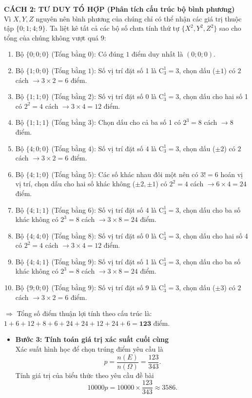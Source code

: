 \begin{ex}
{		\vfill
		\textbf{CÁCH 2: TƯ DUY TỔ HỢP (Phân tích cấu trúc bộ bình phương)}
		\\ Vì $X, Y, Z$ nguyên nên bình phương của chúng chỉ có thể nhận các giá trị thuộc tập $\{0; 1; 4; 9\}$. Ta liệt kê tất cả các bộ số chưa tính thứ tự $\{X^2, Y^2, Z^2\}$ sao cho tổng của chúng không vượt quá $9$:
		\begin{enumerate}
			\item Bộ $\{0;0;0\}$ (Tổng bằng $0$): Có đúng $1$ điểm duy nhất là $(0;0;0)$.
			\item Bộ $\{1;0;0\}$ (Tổng bằng $1$): Số vị trí đặt số 1 là $\mathrm{C}_{3}^{1}=3$, chọn dấu ($\pm 1$) có $2$ cách $\rightarrow 3 \times 2 = 6$ điểm.
			\item Bộ $\{1;1;0\}$ (Tổng bằng $2$): Số vị trí đặt số 0 là $\mathrm{C}_{3}^{1}=3$, chọn dấu cho hai số 1 có $2^2=4$ cách $\rightarrow 3 \times 4 = 12$ điểm.
			\item Bộ $\{1;1;1\}$ (Tổng bằng $3$): Chọn dấu cho cả ba số 1 có $2^3 = 8$ cách $\rightarrow 8$ điểm.
			\item Bộ $\{4;0;0\}$ (Tổng bằng $4$): Số vị trí đặt số 4 là $\mathrm{C}_{3}^{1}=3$, chọn dấu ($\pm 2$) có $2$ cách $\rightarrow 3 \times 2 = 6$ điểm.
			\item Bộ $\{4;1;0\}$ (Tổng bằng $5$): Các số khác nhau đôi một nên có $3! = 6$ hoán vị vị trí, chọn dấu cho hai số khác không ($\pm 2, \pm 1$) có $2^2 = 4$ cách $\rightarrow 6 \times 4 = 24$ điểm.
			\item Bộ $\{4;1;1\}$ (Tổng bằng $6$): Số vị trí đặt số 4 là $\mathrm{C}_{3}^{1}=3$, chọn dấu cho ba số khác không có $2^3 = 8$ cách $\rightarrow 3 \times 8 = 24$ điểm.
			\item Bộ $\{4;4;0\}$ (Tổng bằng $8$): Số vị trí đặt số 0 là $\mathrm{C}_{3}^{1}=3$, chọn dấu cho hai số 4 có $2^2 = 4$ cách $\rightarrow 3 \times 4 = 12$ điểm.
			\item Bộ $\{4;4;1\}$ (Tổng bằng $9$): Số vị trí đặt số 1 là $\mathrm{C}_{3}^{1}=3$, chọn dấu cho ba số khác không có $2^3 = 8$ cách $\rightarrow 3 \times 8 = 24$ điểm.
			\item Bộ $\{9;0;0\}$ (Tổng bằng $9$): Số vị trí đặt số 9 là $\mathrm{C}_{3}^{1}=3$, chọn dấu ($\pm 3$) có $2$ cách $\rightarrow 3 \times 2 = 6$ điểm.
		\end{enumerate}
		$\Rightarrow$ Tổng số điểm thuận lợi tính theo cấu trúc là: $1 + 6 + 12 + 8 + 6 + 24 + 24 + 12 + 24 + 6 = \mathbf{123}$ điểm.
		\begin{itemize}
			\item \textbf{Bước 3: Tính toán giá trị xác suất cuối cùng}\\
			Xác suất hình học để chọn trúng điểm yêu cầu là
			\[ p = \dfrac{n(E)}{n(\Omega)} = \dfrac{123}{343}.\]
			Tính giá trị của biểu thức theo yêu cầu đề bài
			\[ 10000p = 10000 \times \dfrac{123}{343} \approx 3586.\]
		\end{itemize}
	}
\end{ex}